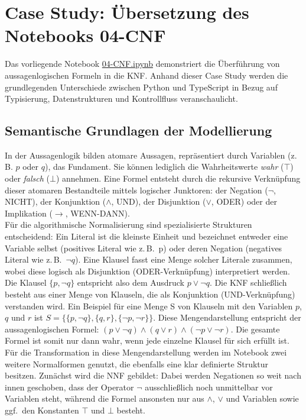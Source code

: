 \section{Case Study: Übersetzung des Notebooks 04-CNF}
Das vorliegende Notebook \href{https://github.com/zLeoll/TS-Translation-for-TheoInf/blob/main/Logic/Chapter-4/04-CNF.ipynb}{04-CNF.ipynb} demonstriert die Überführung von aussagenlogischen Formeln in die \ac{KNF}. Anhand dieser Case Study werden die grundlegenden Unterschiede zwischen Python und TypeScript in Bezug auf Typisierung, Datenstrukturen und Kontrollfluss veranschaulicht.


\subsection{Semantische Grundlagen der Modellierung} In der Aussagenlogik bilden atomare Aussagen, repräsentiert durch Variablen (z. B. $p$ oder $q$), das Fundament. Sie können lediglich die Wahrheitswerte \textit{wahr} ($\top$) oder \textit{falsch} ($\bot$) annehmen. Eine Formel entsteht durch die rekursive Verknüpfung dieser atomaren Bestandteile mittels logischer Junktoren: der Negation ($\neg$, NICHT), der Konjunktion ($\land$, UND), der Disjunktion ($\lor$, ODER) oder der Implikation ($\to$, WENN-DANN).\\ Für die algorithmische Normalisierung sind spezialisierte Strukturen entscheidend: Ein Literal ist die kleinste Einheit und bezeichnet entweder eine Variable selbst (positives Literal wie z.\,B.\ p) oder deren Negation (negatives Literal wie z.\,B.\ \(\neg q\)). Eine Klausel fasst eine Menge solcher Literale zusammen, wobei diese logisch als Disjunktion (ODER-Verknüpfung) interpretiert werden. Die Klausel \(\{p,\neg q\}\) entspricht also dem Ausdruck \(p \lor \neg q\). Die \ac{KNF} schließlich besteht aus einer Menge von Klauseln, die als Konjunktion (UND-Verknüpfung) verstanden wird. Ein Beispiel für eine Menge S von Klauseln mit den Variablen \(p\), \(q\) und \(r\) ist \(S = \{\{p, \neg q\}, \{q, r\}, \{\neg p, \neg r\}\}\). Diese Mengendarstellung entspricht der aussagenlogischen Formel: \((p \lor \neg q) \land (q \lor r) \land (\neg p \lor \neg r)\). Die gesamte Formel ist somit nur dann wahr, wenn jede einzelne Klausel für sich erfüllt ist. 
Für die Transformation in diese Mengendarstellung werden im Notebook zwei weitere Normalformen genutzt, die ebenfalls eine klar definierte Struktur besitzen. Zunächst wird die \ac{NNF} gebildet: Dabei werden Negationen so weit nach innen geschoben, dass der Operator \(\neg\) ausschließlich noch unmittelbar vor Variablen steht, während die Formel ansonsten nur aus \(\land\), \(\lor\) und Variablen sowie ggf.\ den Konstanten \(\top\) und \(\bot\) besteht. 
